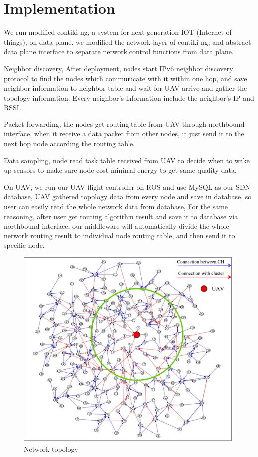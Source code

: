 \section{Implementation}
\label{Imp}

We run modified contiki-ng, a system for next generation IOT (Internet of things), on data plane. we modified the network layer of contiki-ng, and abstract data plane interface to separate network control functions from data plane. 

Neighbor discovery, After deployment, nodes start IPv6 neighbor discovery protocol to find the nodes which communicate with it within one hop, and save neighbor information to neighbor table and wait for UAV arrive 
and gather the topology information. Every neighbor's information include the neighbor's IP and RSSI. 

Packet forwarding, the nodes get routing table from UAV through northbound interface, when it receive a data packet from other nodes, it just send it to the next hop node according the routing table.

Data sampling, node read task table received from UAV to decide when to wake up sensors to make sure node cost minimal energy to get same quality data. 

On UAV, we run our UAV flight controller on ROS and use MySQL as our SDN database, UAV gathered topology data from every node and save in database, 
so user can easily read the whole network data from database, For the same 
reasoning, after user get routing algorithm result and save it to database via northbound interface, 
our middleware will automatically divide the whole network routing result to individual node routing table, and then send it to specific node.

\begin{figure}[htbp]
	\centering
	\includegraphics[width=.85\columnwidth]{Figure/topology}
	\vspace{-0.1in}
	\caption{Network topology}
	\label{routing-flow}
	\vspace{-0.1in}
\end{figure}

